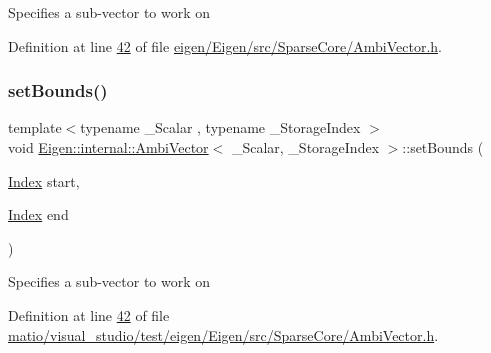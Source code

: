 Specifies a sub-\/vector to work on 

Definition at line \hyperlink{eigen_2_eigen_2src_2_sparse_core_2_ambi_vector_8h_source_l00042}{42} of file \hyperlink{eigen_2_eigen_2src_2_sparse_core_2_ambi_vector_8h_source}{eigen/\+Eigen/src/\+Sparse\+Core/\+Ambi\+Vector.\+h}.

\mbox{\label{class_eigen_1_1internal_1_1_ambi_vector_a8a37e06682a29a63239d914de342096c}} 
\subsubsection{\texorpdfstring{set\+Bounds()}{setBounds()}\hspace{0.1cm}{\footnotesize\ttfamily [2/2]}}
{\footnotesize\ttfamily template$<$typename \+\_\+\+Scalar , typename \+\_\+\+Storage\+Index $>$ \\
void \hyperlink{class_eigen_1_1internal_1_1_ambi_vector}{Eigen\+::internal\+::\+Ambi\+Vector}$<$ \+\_\+\+Scalar, \+\_\+\+Storage\+Index $>$\+::set\+Bounds (\begin{DoxyParamCaption}\item[{\hyperlink{namespace_eigen_a62e77e0933482dafde8fe197d9a2cfde}{Index}}]{start,  }\item[{\hyperlink{namespace_eigen_a62e77e0933482dafde8fe197d9a2cfde}{Index}}]{end }\end{DoxyParamCaption})\hspace{0.3cm}{\ttfamily [inline]}}

Specifies a sub-\/vector to work on 

Definition at line \hyperlink{matio_2visual__studio_2test_2eigen_2_eigen_2src_2_sparse_core_2_ambi_vector_8h_source_l00042}{42} of file \hyperlink{matio_2visual__studio_2test_2eigen_2_eigen_2src_2_sparse_core_2_ambi_vector_8h_source}{matio/visual\+\_\+studio/test/eigen/\+Eigen/src/\+Sparse\+Core/\+Ambi\+Vector.\+h}.

\mbox{\label{class_eigen_1_1internal_1_1_ambi_vector_af472b476758307bcc1621d9eb4018f6a}} 

